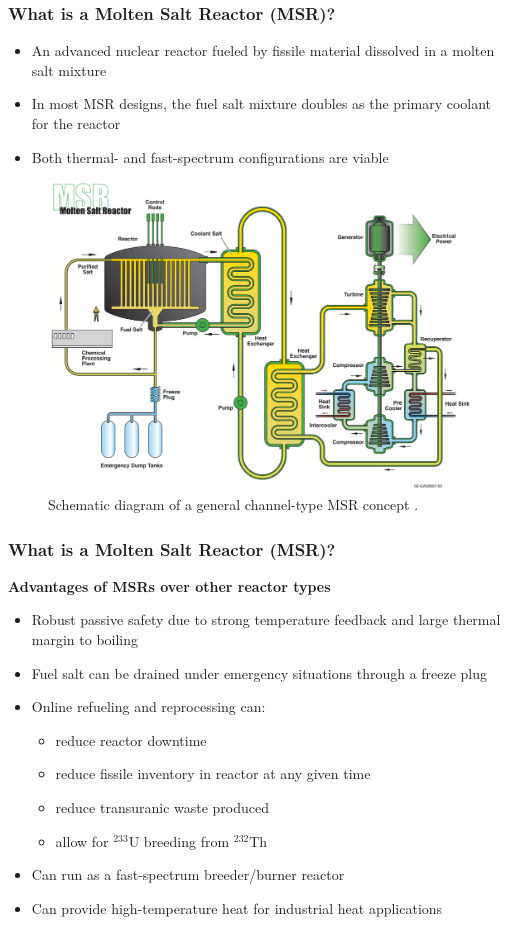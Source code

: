 \begin{frame}
  \frametitle{What is a Molten Salt Reactor (MSR)?}
	\begin{itemize}
	  \item An advanced nuclear reactor fueled by fissile
		material dissolved in a molten salt mixture
	  \item In most MSR designs, the fuel salt mixture doubles as the primary coolant for the
        reactor
	  \item Both thermal- and fast-spectrum configurations are viable
	\end{itemize}
	\begin{figure}
	  \centering
	  \includegraphics[width=.5\textwidth]{./images/msr}
      \caption{Schematic diagram of a general channel-type MSR concept \cite{doe_technology_2002}.}
	  \label{fig:msr}
	\end{figure}
\end{frame}

\begin{frame}
  \frametitle{What is a Molten Salt Reactor (MSR)?}
  \textbf{Advantages of MSRs over other reactor types}
  \begin{itemize}
    \item Robust passive safety due to strong temperature feedback and large thermal margin to
      boiling
    \item Fuel salt can be drained under emergency situations through a freeze plug
    \item Online refueling and reprocessing can:
      \begin{itemize}
        \item reduce reactor downtime
        \item reduce fissile inventory in reactor at any given time
        \item reduce transuranic waste produced
        \item allow for $^{233}$U breeding from $^{232}$Th
      \end{itemize}
    \item Can run as a fast-spectrum breeder/burner reactor
    \item Can provide high-temperature heat for industrial heat applications
  \end{itemize}
\end{frame}


